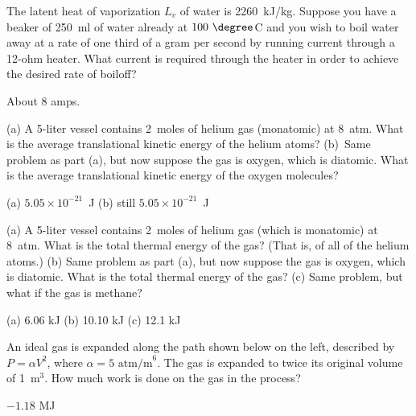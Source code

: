 \begin{Exercise}
The latent heat of vaporization $L_v$ of water is 2260~kJ/kg. Suppose you have a beaker of 250~ml of water already at $100~\degree$C and you wish to boil water away at a rate of one third of a gram per second by running current through a 12-ohm heater.  What current is required through the heater in order to achieve the desired rate of boiloff? 
\end{Exercise}
\begin{Answer}
About 8 amps.
\end{Answer}


\begin{Exercise}
(a) A 5-liter vessel contains 2~moles of helium gas (monatomic) at 8~atm.  
What is the average translational kinetic energy of the helium atoms? 
(b)~Same problem as part (a), but now suppose the gas is oxygen, which is diatomic. What is the average translational kinetic energy of the oxygen molecules?
\end{Exercise}
\begin{Answer}
(a) $5.05\times10^{-21}$~J (b) still $5.05\times10^{-21}$~J 
\end{Answer}


\begin{Exercise}
(a) A 5-liter vessel contains 2~moles of helium gas (which is monatomic) at 8~atm.  What is the total thermal energy of the gas? (That is, of all of the helium atoms.) 
(b) Same problem as part (a), but now suppose the gas is oxygen, which is diatomic. What is the total thermal energy of the gas?  
(c)  Same problem, but what if the gas is methane?\end{Exercise}
\begin{Answer}
(a) 6.06 kJ (b) 10.10 kJ (c) 12.1 kJ
\end{Answer}



\begin{Exercise}
An ideal gas is expanded along the path shown below on the left, described by $P=\alpha V^2$, where $\alpha=5\text{~atm/m}^6$.   The gas is expanded to twice its original volume of 1~m$^3$.  How much work is done on the gas in the process?
\end{Exercise}
\begin{Answer}
$-1.18$ MJ
\end{Answer}

